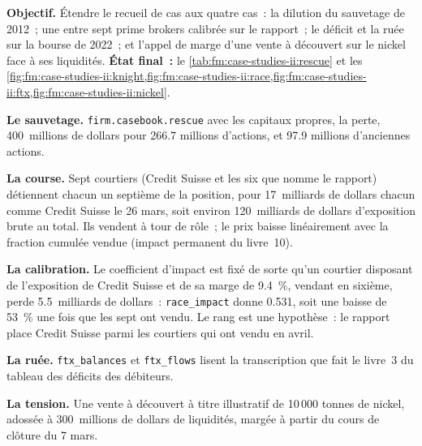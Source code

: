 \begin{tutorial}
\textbf{Objectif.} Étendre le recueil de cas aux quatre cas~: la dilution du sauvetage de 2012~; une  entre sept prime brokers calibrée sur le rapport~;
le déficit et la ruée sur la bourse de 2022~; et l'appel de marge d'une vente à découvert sur le nickel face à ses liquidités. \textbf{État final~:} le
\cref{tab:fm:case-studies-ii:rescue} et les \cref{fig:fm:case-studies-ii:knight,fig:fm:case-studies-ii:race,fig:fm:case-studies-ii:ftx,fig:fm:case-studies-ii:nickel}.
\begin{tutsteps}
\item \textbf{Le sauvetage.} \texttt{firm.casebook.rescue} avec les capitaux propres, la perte, 400~millions de dollars pour 266.7 millions d'actions, et 97.9 millions d'anciennes actions.
\item \textbf{La course.} Sept courtiers (Credit Suisse et les six que nomme le rapport) détiennent chacun un septième de la position, pour 17~milliards de dollars chacun comme Credit
Suisse le 26 mars, soit environ 120~milliards de dollars d'exposition brute au total. Ils vendent à tour de rôle~; le prix baisse linéairement avec la fraction cumulée vendue (impact
permanent du livre~10).
\item \textbf{La calibration.} Le coefficient d'impact est fixé de sorte qu'un courtier disposant de l'exposition de Credit Suisse et de sa marge de 9.4~\%, vendant en sixième, perde
5.5~milliards de dollars~: \texttt{race\_impact} donne 0.531, soit une baisse de 53~\% une fois que les sept ont vendu. Le rang est une hypothèse~: le rapport place Credit
Suisse parmi les courtiers qui ont vendu en avril.
\item \textbf{La ruée.} \texttt{ftx\_balances} et \texttt{ftx\_flows} lisent la transcription que fait le livre~3 du tableau des déficits des débiteurs.
\item \textbf{La tension.} Une vente à découvert à titre illustratif de 10\,000 tonnes de nickel, adossée à 300~millions de dollars de liquidités, margée à partir du cours de clôture du 7 mars.
\end{tutsteps}
\end{tutorial}

\label{lst:fm:case-studies-ii:race}

